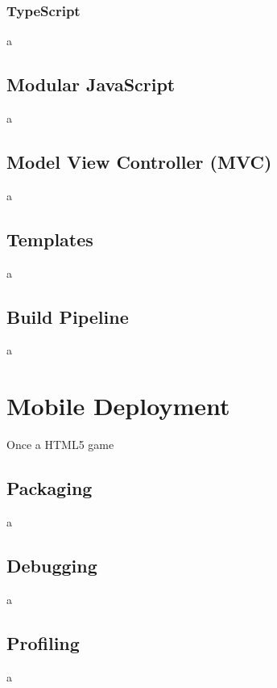 \documentclass[final]{cmpreport}
\begin{document}
\subsubsection{TypeScript}
a

\subsection{Modular JavaScript}
a


\subsection{Model View Controller (MVC)}
a

\subsection{Templates}
a

\subsection{Build Pipeline}
a

\section{Mobile Deployment}
Once a HTML5 game 

\subsection{Packaging}
a

\subsection{Debugging}
a

\subsection{Profiling}
a


\clearpage

\end{document}
